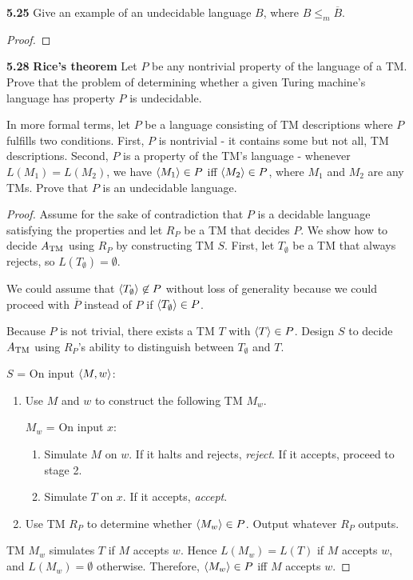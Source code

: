 \textbf{5.25} Give an example of an undecidable language $B$, where $B \leq_m \overline{B}$.

\begin{mdframed}
\begin{proof}

\end{proof}
\end{mdframed}

\textbf{5.28} \textbf{Rice's theorem} Let $P$ be any nontrivial property of the language of a TM. Prove that the problem of determining whether a given Turing machine's language has property $P$ is undecidable.

In more formal terms, let $P$ be a language consisting of TM descriptions where $P$ fulfills two conditions. First, $P$ is nontrivial - it contains some but not all, TM descriptions. Second, $P$ is a property of the TM's language - whenever $L(M_1) = L(M_2)$, we have $\langle{M_1}\rangle \in P$ iff $\langle{M_2}\rangle \in P$, where $M_1$ and $M_2$ are any TMs. Prove that $P$ is an undecidable language.

\begin{mdframed}
\begin{proof}
Assume for the sake of contradiction that $P$ is a decidable language satisfying the properties and let $R_P$ be a TM that decides $P$. We show how to decide $A_{\text{TM}}$ using $R_P$ by constructing TM $S$. First, let $T_\emptyset$ be a TM that always rejects, so $L(T_\emptyset) = \emptyset$. 

We could assume that $\langle{T_\emptyset}\rangle \not \in P$ without loss of generality because we could proceed with $\overline{P}$ instead of $P$ if $\langle{T_\emptyset}\rangle\in P$. 

Because $P$ is not trivial, there exists a TM $T$ with $\langle{T}\rangle \in P$. Design $S$ to decide $A_{\text{TM}}$ using $R_P$'s ability to distinguish between $T_\emptyset$ and $T$.

$S$ = On input $\langle{M, w}\rangle$:
\begin{enumerate}
\item Use $M$ and $w$ to construct the following TM $M_w$.

$M_w$ = On input $x$:
\begin{enumerate}
\item Simulate $M$ on $w$. If it halts and rejects, \textit{reject}. If it accepts, proceed to stage 2.
\item Simulate $T$ on $x$. If it accepts, \textit{accept}.
\end{enumerate}
\item Use TM $R_P$ to determine whether $\langle{M_w}\rangle\in P$. Output whatever $R_P$ outputs.
\end{enumerate}
TM $M_w$ simulates $T$ if $M$ accepts $w$. Hence $L(M_w) = L(T)$ if $M$ accepts $w$, and $L(M_w) = \emptyset$ otherwise. Therefore, $\langle{M_w}\rangle \in P$ iff $M$ accepts $w$.

\end{proof}
\end{mdframed}

